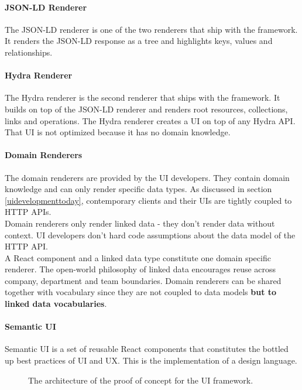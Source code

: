 \paragraph{JSON-LD Renderer}
The JSON-LD renderer is one of the two renderers that ship with the framework. It renders the JSON-LD response as a tree and highlights keys, values and relationships.

\paragraph{Hydra Renderer}
The Hydra renderer is the second renderer that ships with the framework. It builds on top of the JSON-LD renderer and renders root resources, collections, links and operations. The Hydra renderer creates a UI on top of any Hydra API. That UI is not optimized because it has no domain knowledge.

\paragraph{Domain Renderers}
The domain renderers are provided by the UI developers. They contain domain knowledge and can only render specific data types. As discussed in section \ref{uidevelopmenttoday}, contemporary clients and their UIs are tightly coupled to HTTP APIs. \\
Domain renderers only render linked data - they don't render data without context. UI developers don't hard code assumptions about the data model of the HTTP API. \\
A React component and a linked data type constitute one domain specific renderer. The open-world philosophy of linked data encourages reuse across company, department and team boundaries. Domain renderers can be shared together with vocabulary since they are not coupled to data models \textbf{but to linked data vocabularies}.

\paragraph{Semantic UI}
Semantic UI is a set of reusable React components that constitutes the bottled up best practices of UI and UX. This is the implementation of a design language.

\begin{figure}[!htb]
  \caption{The architecture of the proof of concept for the UI framework.}
\end{figure}

